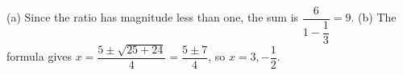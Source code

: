 (a) Since the ratio has magnitude less than one, the sum is $\dfrac{6}{1-\dfrac{1}{3}}=\boxed9$. (b) The formula gives $x=\dfrac{5\pm\sqrt{25+24}}{4}=\dfrac{5\pm7}{4}$, so $\boxed{x=3,-\dfrac{1}{2}}$.
